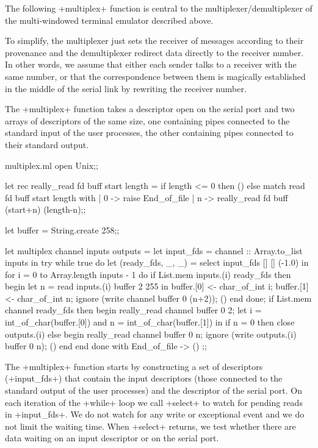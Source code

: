 \begin{example} 
The following \ml+multiplex+ function is central to the
multiplexer/demultiplexer of the multi-windowed terminal emulator
described above.

To simplify, the multiplexer just sets the receiver of messages
according to their provenance and the demultiplexer redirect data
directly to the receiver number. In other words, we assume that either
each sender talks to a receiver with the same number, or that the
correspondence between them is magically established in the middle of
the serial link by rewriting the receiver number.

The \ml+multiplex+ function takes a descriptor open on the serial port
and two arrays of descriptors of the same size, one containing pipes
connected to the standard input of the user processes, the other
containing pipes connected to their standard output.
%
\begin{listingcodefile}{multiplex.ml}
open Unix;;

let rec really_read fd buff start length =
  if length <= 0 then () else
    match read fd buff start length with
    | 0 -> raise End_of_file
    | n -> really_read fd buff (start+n) (length-n);;

let buffer = String.create 258;;

let multiplex channel inputs outputs =
  let input_fds = channel :: Array.to_list inputs in
  try
    while true do
      let (ready_fds, _, _) = select input_fds [] [] (-1.0) in
      for i = 0 to Array.length inputs - 1 do
        if List.mem inputs.(i) ready_fds then begin
          let n = read inputs.(i) buffer 2 255 in
          buffer.[0] <- char_of_int i;
          buffer.[1] <- char_of_int n;
          ignore (write channel buffer 0 (n+2));
          ()
        end
      done;
      if List.mem channel ready_fds then begin
        really_read channel buffer 0 2;
        let i = int_of_char(buffer.[0])
        and n = int_of_char(buffer.[1]) in
        if n = 0 then close outputs.(i) else 
        begin
          really_read channel buffer 0 n;
          ignore (write outputs.(i) buffer 0 n);
          ()
        end
      end
    done
  with End_of_file -> () ;;
\end{listingcodefile}

The \ml+multiplex+ function starts by constructing a set of
descriptors (\ml+input_fds+) that contain the input descriptors
(those connected to the standard output of the user processes) and the
descriptor of the serial port. On each iteration of the 
\ml+while+ loop we call \ml+select+ to watch for pending reads in
\ml+input_fds+. We do not watch for any write or exceptional event and
we do not limit the waiting time. When \ml+select+ returns, we test whether
there are data waiting on an input descriptor or on the serial port.


\end{example}
